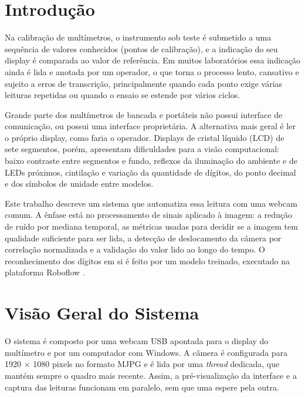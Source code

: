 \documentclass[10pt,twocolumn,letterpaper]{article}
\begin{document}
\section{Introdução}

Na calibração de multímetros, o instrumento sob teste é submetido a uma
sequência de valores conhecidos (pontos de calibração), e a indicação do seu
display é comparada ao valor de referência. Em muitos laboratórios essa
indicação ainda é lida e anotada por um operador, o que torna o processo lento,
cansativo e sujeito a erros de transcrição, principalmente quando cada ponto
exige várias leituras repetidas ou quando o ensaio se estende por vários ciclos.

Grande parte dos multímetros de bancada e portáteis não possui interface de
comunicação, ou possui uma interface proprietária. A alternativa mais geral é
ler o próprio display, como faria o operador. Displays de cristal líquido (LCD)
de sete segmentos, porém, apresentam dificuldades para a visão computacional:
baixo contraste entre segmentos e fundo, reflexos da iluminação do ambiente e
de LEDs próximos, cintilação e variação da quantidade de dígitos, do ponto
decimal e dos símbolos de unidade entre modelos.

Este trabalho descreve um sistema que automatiza essa leitura com uma webcam
comum. A ênfase está no processamento de sinais aplicado à imagem: a redução de
ruído por mediana temporal, as métricas usadas para decidir se a imagem tem
qualidade suficiente para ser lida, a detecção de deslocamento da câmera por
correlação normalizada e a validação do valor lido ao longo do tempo. O
reconhecimento dos dígitos em si é feito por um modelo treinado, executado na
plataforma Roboflow \cite{roboflow}.

\section{Visão Geral do Sistema}

O sistema é composto por uma webcam USB apontada para o display do multímetro e
por um computador com Windows. A câmera é configurada para 1920 × 1080 pixels
no formato MJPG e é lida por uma \textit{thread} dedicada, que mantém sempre o
quadro mais recente. Assim, a pré-visualização da interface e a captura das
leituras funcionam em paralelo, sem que uma espere pela outra.
\end{document}
